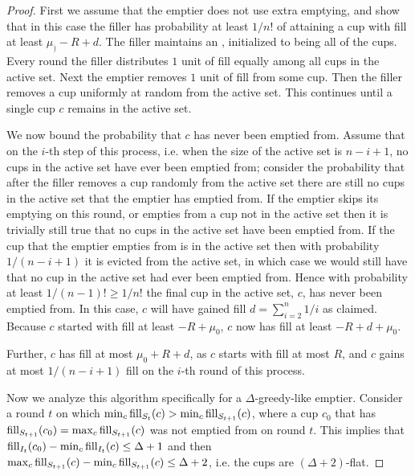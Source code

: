 \begin{proof}
  First we assume that the emptier does not use extra emptying,
  and show that in this case the filler has probability at least
  $1/n!$ of attaining a cup with fill at least $\mu_) -R +d$.
  The filler maintains an , initialized to being
  all of the cups. Every round the filler distributes $1$ unit of
  fill equally among all cups in the active set. Next the emptier
  removes $1$ unit of fill from some cup. Then the filler
  removes a cup uniformly at random from the active set. This
  continues until a single cup $c$ remains in the active set. 

  We now bound the probability that $c$ has never been emptied
  from. Assume that on the $i$-th step of this process, i.e. when
  the size of the active set is $n-i+1$, no cups in the active
  set have ever been emptied from; consider the probability that
  after the filler removes a cup randomly from the active set
  there are still no cups in the active set that the emptier has
  emptied from. If the emptier skips its emptying on this round,
  or empties from a cup not in the active set then it is
  trivially still true that no cups in the active set have been
  emptied from. If the cup that the emptier empties from is in
  the active set then with probability $1/(n-i+1)$ it is evicted
  from the active set, in which case we would still have that no
  cup in the active set had ever been emptied from. Hence with
  probability at least $1/(n-1)! \ge 1/n!$ the final cup in the
  active set, $c$, has never been emptied from. In this case, $c$
  will have gained fill $d=\sum_{i=2}^n 1/i$ as claimed. Because
  $c$ started with fill at least $-R+\mu_0$, $c$ now has fill at
  least $-R+ d+\mu_0$. 

  Further, $c$ has fill at most $\mu_0 + R + d$, as $c$ starts with fill
  at most $R$, and $c$ gains at most $1/(n-i+1)$ fill on the
  $i$-th round of this process.

  Now we analyze this algorithm specifically for a
  $\Delta$-greedy-like emptier. Consider a round $t$ on which
  $\min_c \operatorname{\textnormal{fill}}_{S_t}(c) > \min_c \operatorname{\textnormal{fill}}_{S_{t+1}}(c)$, where a cup
  $c_0$ that has $\operatorname{\textnormal{fill}}_{S_{t+1}}(c_0) = \max_{c}
  \operatorname{\textnormal{fill}}_{S_{t+1}}(c)$ was not emptied from on round $t$. This
  implies that $\operatorname{\textnormal{fill}}_{I_t}(c_0) - \min_c \operatorname{\textnormal{fill}}_{I_t}(c) \le \Delta
  + 1$ and then $\max_c \operatorname{\textnormal{fill}}_{S_{t+1}}(c) - \min_c
  \operatorname{\textnormal{fill}}_{S_{t+1}}(c) \le \Delta + 2$, i.e. the cups are $(\Delta +
  2)$-flat. 


\end{proof}
